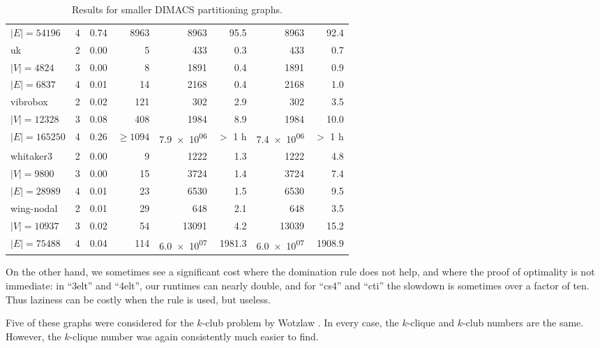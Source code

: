 \documentclass[letterpaper]{article}
\begin{document}
\begin{table}
\begin{tabular}{l c rr rr rr}
\hspace*{0.2em}\color{gray}$|E|{=}54196$& 4&0.74&8963&8963&95.5&8963&92.4\\
uk  & 2&0.00&5&433&0.3&433&0.7\\
\hspace*{0.2em}\color{gray}$|V|{=}4824$& 3&0.00&8&1891&0.4&1891&0.9\\
\hspace*{0.2em}\color{gray}$|E|{=}6837$& 4&0.01&14&2168&0.4&2168&1.0\\
vibrobox  & 2&0.02&121&302&2.9&302&3.5\\
\hspace*{0.2em}\color{gray}$|V|{=}12328$& 3&0.08&408&1984&8.9&1984&10.0\\
\hspace*{0.2em}\color{gray}$|E|{=}165250$& 4&0.26&${\ge}1094$&\color{gray}\num{7.9e+06}&\color{gray}$>$ 1 h&\color{gray}\num{7.4e+06}&\color{gray}$>$ 1 h\\
whitaker3  & 2&0.00&9&1222&1.3&1222&4.8\\
\hspace*{0.2em}\color{gray}$|V|{=}9800$& 3&0.00&15&3724&1.4&3724&7.4\\
\hspace*{0.2em}\color{gray}$|E|{=}28989$& 4&0.01&23&6530&1.5&6530&9.5\\
wing-nodal  & 2&0.01&29&648&2.1&648&3.5\\
\hspace*{0.2em}\color{gray}$|V|{=}10937$& 3&0.02&54&13091&4.2&13039&15.2\\
\hspace*{0.2em}\color{gray}$|E|{=}75488$& 4&0.04&114&\num{6.0e+07}&1981.3&\num{6.0e+07}&1908.9\\
    \bottomrule
\end{tabular}
    \caption{Results for smaller DIMACS partitioning graphs.}\label{table:partitioning}
\end{table}

On the other hand, we sometimes see a significant cost where the domination rule does not help, and
where the proof of optimality is not immediate: in ``3elt'' and ``4elt'', our runtimes can nearly
double, and for ``cs4'' and ``cti'' the slowdown is sometimes over a factor of ten. Thus laziness
can be costly when the rule is used, but useless.

Five of these graphs were considered for the $k$-club problem by Wotzlaw .
In every case, the $k$-clique and $k$-club numbers are the same. However, the $k$-clique number was
again consistently much easier to find.
\end{document}
